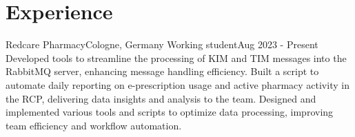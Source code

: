 \section{Experience}
\resumeSubHeadingListStart

\resumeSubheading
{Redcare Pharmacy}{Cologne, Germany}
{Working student}{Aug 2023 - Present}
\resumeItemListStart
{}
{Developed tools to streamline the processing of KIM and TIM messages into the RabbitMQ server, enhancing message handling efficiency.}
{Built a script to automate daily reporting on e-prescription usage and active pharmacy activity in the RCP, delivering data insights and analysis to the team.}
{Designed and implemented various tools and scripts to optimize data processing, improving team efficiency and workflow automation.}
\resumeItemListEnd





\resumeSubHeadingListEnd

